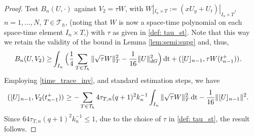 \documentclass{amsart}
\newcommand{\norm}[2]{\|{#1}\|_{{#2}}}
\newcommand{\tjump}[1]{\lfloor\kern-0.4mm{#1}\kern-0.4mm\rfloor}
\newcommand{\su}{\sum_{T \in \Th}}
\newcommand{\inner}[3]{({#1},{#2})_{{#3}}}
\newcommand{\Th}{\mathcal{T}_h}
\newcommand{\dt}{\,{\rm dt}}
\newcommand{\utr}{W}
\theoremstyle{definition}
\theoremstyle{remark}
\numberwithin{equation}{section}
\begin{document}
\begin{proof}
Test $B_n(U,\cdot)$ against $V_2=\tau \utr$, with $\utr|_{I_n\times T}:=(x U_y + U_t)|_{I_n\times T}$, $n=1,\dots, N$, $T\in\Th$, (noting that $W$ is now a space-time polynomial on each space-time element $I_n\times T$,) with
 $\tau$ as given in \eqref{def: tau_st}. Note that this way we retain the validity of the bound in Lemma \ref{lem:semi:supg} and, thus,
    \begin{equation*}
\begin{split}
        B_n(U,V_2)
        \geq&
        \int_{I_n} \Big(
            \frac{1}{4} \sum_{T \in \Th} \norm{ \sqrt{\tau}W }{T}^2
            - \frac{1}{16} \|U\|_{dG}^2
        \Big) \dt
        +
        \inner{\tjump{U}_{n-1}}{\tau W( t_{n-1}^+)}{}.
\end{split}
    \end{equation*}
    Employing \eqref{time_trace_inv}, and standard estimation steps, we have
    \begin{equation*}\begin{split}
        \inner{\tjump{U}_{n-1}}{V_2( t_{n-1}^+)}{}
        &
         \geq
        -\su 4 \tau_{T,n} (q+1)^2k_n^{-1}\int_{I_n} \norm{ \sqrt{\tau}W}{T}^2
        \dt
        - \frac{1}{16} \norm{\tjump{U}_{n-1}}{}^2.
    \end{split}\end{equation*}
    Since $ 64\tau_{T,n} (q+1)^2k_n^{-1} \leq 1$, due to the  choice of $\tau$ in \eqref{def: tau_st}, the result follows.
\end{proof}
\end{document}
